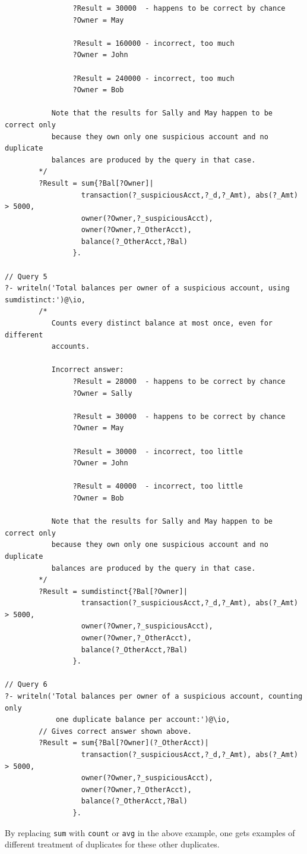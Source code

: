 \documentclass[11pt]{article}
\begin{document}
\begin{verbatim}
                ?Result = 30000  - happens to be correct by chance
                ?Owner = May

                ?Result = 160000 - incorrect, too much
                ?Owner = John

                ?Result = 240000 - incorrect, too much
                ?Owner = Bob

           Note that the results for Sally and May happen to be correct only
           because they own only one suspicious account and no duplicate
           balances are produced by the query in that case.
        */
        ?Result = sum{?Bal[?Owner]|
                  transaction(?_suspiciousAcct,?_d,?_Amt), abs(?_Amt) > 5000,
                  owner(?Owner,?_suspiciousAcct),
                  owner(?Owner,?_OtherAcct),
                  balance(?_OtherAcct,?Bal)
                }.

// Query 5
?- writeln('Total balances per owner of a suspicious account, using sumdistinct:')@\io,
        /*
           Counts every distinct balance at most once, even for different
           accounts.

           Incorrect answer:
                ?Result = 28000  - happens to be correct by chance
                ?Owner = Sally

                ?Result = 30000  - happens to be correct by chance
                ?Owner = May

                ?Result = 30000  - incorrect, too little
                ?Owner = John

                ?Result = 40000  - incorrect, too little
                ?Owner = Bob

           Note that the results for Sally and May happen to be correct only
           because they own only one suspicious account and no duplicate
           balances are produced by the query in that case.
        */
        ?Result = sumdistinct{?Bal[?Owner]|
                  transaction(?_suspiciousAcct,?_d,?_Amt), abs(?_Amt) > 5000,
                  owner(?Owner,?_suspiciousAcct),
                  owner(?Owner,?_OtherAcct),
                  balance(?_OtherAcct,?Bal)
                }.

// Query 6
?- writeln('Total balances per owner of a suspicious account, counting only
            one duplicate balance per account:')@\io,
        // Gives correct answer shown above.
        ?Result = sum{?Bal[?Owner](?_OtherAcct)|
                  transaction(?_suspiciousAcct,?_d,?_Amt), abs(?_Amt) > 5000,
                  owner(?Owner,?_suspiciousAcct),
                  owner(?Owner,?_OtherAcct),
                  balance(?_OtherAcct,?Bal)
                }.
\end{verbatim}
By replacing \texttt{sum} with \texttt{count} or \texttt{avg} in the above
example, one gets examples of different treatment of duplicates for these
other duplicates.   
\end{document}

